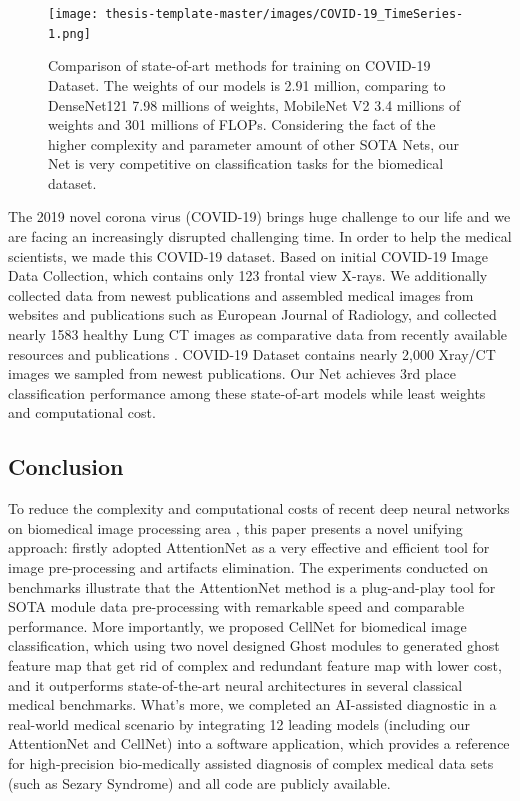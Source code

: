 \begin{figure}[h]
\centering
\texttt{[image: thesis-template-master/images/COVID-19\_TimeSeries-1.png]}
\label{fig}
\centering
\caption{ Comparison of state-of-art methods for training on COVID-19 Dataset.  The weights of our models is 2.91 million, comparing to DenseNet121 7.98 millions of weights, MobileNet V2 3.4 millions of weights and 301 millions of FLOPs. Considering the fact of the higher complexity and parameter amount of other SOTA Nets, our Net is very competitive on classification tasks for the biomedical dataset. }
\end{figure}

The 2019 novel corona virus (COVID-19) brings huge challenge to our life and we are facing an increasingly disrupted challenging time. In order to help the medical scientists, we made this COVID-19 dataset. Based on initial COVID-19 Image Data Collection\cite{37}, which contains only 123 frontal view X-rays. We additionally collected data from newest publications and  assembled medical images from websites and publications such as European Journal of Radiology\cite{36}, and collected nearly 1583 healthy Lung CT images as comparative data from recently available resources and publications\cite{37} \cite{38}. COVID-19 Dataset contains nearly 2,000 Xray/CT images we sampled from newest publications. Our Net achieves 3rd place classification performance among these state-of-art models while least weights and computational cost.




\subsection*{Conclusion}
To reduce the complexity and computational costs of recent deep neural networks on biomedical image processing area \cite{3}\cite{15}\cite{17}, this paper presents a novel unifying approach: firstly adopted AttentionNet as a very effective and efficient tool for image pre-processing and artifacts elimination. The experiments conducted on benchmarks illustrate that the AttentionNet method is a plug-and-play tool for SOTA module data pre-processing with remarkable speed and comparable performance. More importantly, we proposed CellNet for biomedical image classification, which using two novel designed Ghost modules to generated ghost feature map that get rid of complex and redundant feature map with lower cost, and it outperforms state-of-the-art neural architectures in several classical medical benchmarks.
What's more, we completed an AI-assisted diagnostic in a real-world medical scenario by integrating 12 leading models (including our AttentionNet and CellNet) into a software application, which provides a reference for high-precision bio-medically assisted diagnosis of complex medical data sets (such as Sezary Syndrome) and all code are publicly available.















